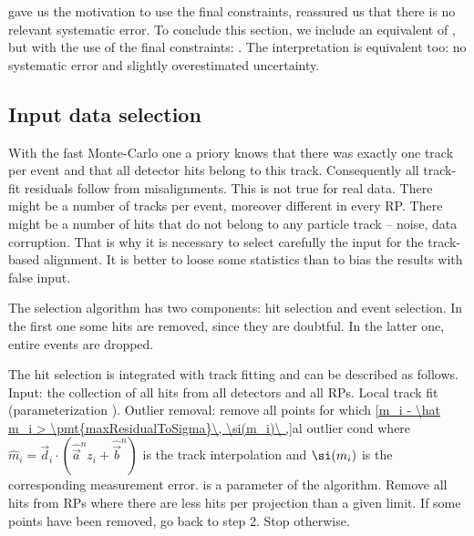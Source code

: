 
 gave us the motivation to use the final constraints,  reassured us that there is no relevant systematic error. To conclude this section, we include an equivalent of , but with the use of the final constraints: . The interpretation is equivalent too: no systematic error and slightly overestimated uncertainty.



\subsection[al data sel]{Input data selection}

With the fast Monte-Carlo one a priory knows that there was exactly one track per event and that all detector hits belong to this track. Consequently all track-fit residuals follow from misalignments. This is not true for real data. There might be a number of tracks per event, moreover different in every RP. There might be a number of hits that do not belong to any particle track -- noise, data corruption. That is why it is necessary to select carefully the input for the track-based alignment. It is better to loose some statistics than to bias the results with false input.

The selection algorithm has two components: hit selection and event selection. In the first one some hits are removed, since they are doubtful. In the latter one, entire events are dropped.

The hit selection is integrated with track fitting and can be described as follows.
\bitm
\itm Input: the collection of all hits from all detectors and all RPs.
\itm Local track fit (parameterization ).
\itm Outlier removal: remove all points for which
\eqref{m_i - \hat m_i > \pmt{maxResidualToSigma}\, \si(m_i)\ ,}{al outlier cond}
where $\hat m_i = \vec d_i \cdot (\hat\vec a^n z_i + \hat\vec b^n)$ is the track interpolation and $\si(m_i)$ is the corresponding measurement error.  is a parameter of the algorithm.
\itm Remove all hits from RPs where there are less hits per projection than a given limit\break {}.
\itm If some points have been removed, go back to step 2. Stop otherwise.
\eitm

